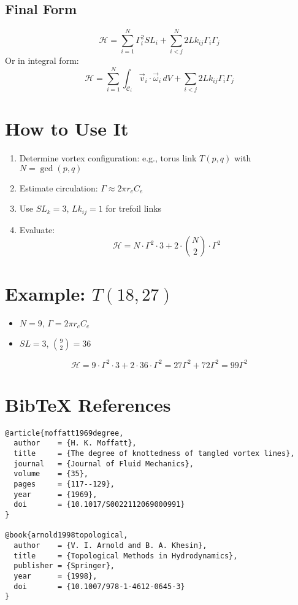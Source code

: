 \subsection*{Final Form}
\begin{equation}
    \boxed{
        \mathcal{H} = \sum_{i=1}^{N} \Gamma_i^2 SL_i + \sum_{i < j}^{N} 2 Lk_{ij} \Gamma_i \Gamma_j
    }
\end{equation}
Or in integral form:
\begin{equation}
    \boxed{
        \mathcal{H} = \sum_{i=1}^{N} \int_{\mathcal{C}_i} \vec{v}_i \cdot \vec{\omega}_i \, dV + \sum_{i < j} 2 Lk_{ij} \Gamma_i \Gamma_j
    }
\end{equation}

\section{ How to Use It}
\begin{enumerate}
    \item Determine vortex configuration: e.g., torus link $T(p,q)$ with $N = \gcd(p,q)$
    \item Estimate circulation: $\Gamma \approx 2\pi r_c C_e$
    \item Use $SL_k = 3$, $Lk_{ij} = 1$ for trefoil links
    \item Evaluate:
    \[ \mathcal{H} = N \cdot \Gamma^2 \cdot 3 + 2 \cdot \binom{N}{2} \cdot \Gamma^2 \]
\end{enumerate}

\section{ Example: $T(18,27)$}
\begin{itemize}
    \item $N = 9$, $\Gamma = 2\pi r_c C_e$
    \item $SL = 3$, $\binom{9}{2} = 36$
\end{itemize}
\begin{equation}
    \mathcal{H} = 9 \cdot \Gamma^2 \cdot 3 + 2 \cdot 36 \cdot \Gamma^2 = 27\Gamma^2 + 72\Gamma^2 = 99\Gamma^2
\end{equation}

\section*{BibTeX References}
\begin{verbatim}
@article{moffatt1969degree,
  author    = {H. K. Moffatt},
  title     = {The degree of knottedness of tangled vortex lines},
  journal   = {Journal of Fluid Mechanics},
  volume    = {35},
  pages     = {117--129},
  year      = {1969},
  doi       = {10.1017/S0022112069000991}
}

@book{arnold1998topological,
  author    = {V. I. Arnold and B. A. Khesin},
  title     = {Topological Methods in Hydrodynamics},
  publisher = {Springer},
  year      = {1998},
  doi       = {10.1007/978-1-4612-0645-3}
}
\end{verbatim}

